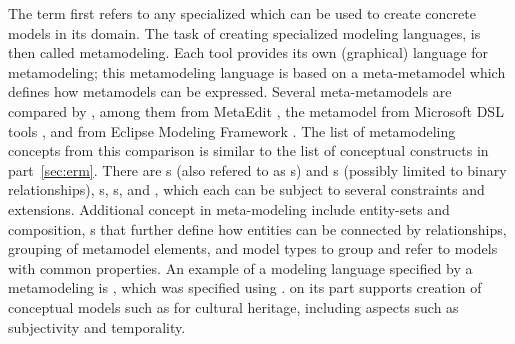 The term  first refers to any specialized  which can
be used to create concrete models in its domain. The task of creating
specialized modeling languages, is then called metamodeling. Each 
tool provides its own (graphical) language for metamodeling; this metamodeling
language is based on a meta-metamodel which defines how metamodels can be
expressed. Several meta-metamodels are compared by \textcite{Kern2011}, among
them  from MetaEdit \cite{Kelly2008}, the metamodel from Microsoft
DSL tools \cite{Cook2007}, and  from Eclipse Modeling Framework
\cite{Steinberg2009}. The list of metamodeling concepts from this comparison
is similar to the list of conceptual  constructs in
part~\ref{sec:erm}. There are s (also refered to as
s) and s (possibly limited to binary relationships), s,
s, and , which each can be subject to several
constraints and extensions. Additional concept in meta-modeling include
entity-sets and composition, s that further define how
entities can be connected by relationships, grouping of metamodel elements, and
model types to group and refer to models with common properties.  An example of
a modeling language specified by a metamodeling is 
\cite{GonzalezPerez2012c}, which was specified using . 
on its part supports creation of conceptual models such as  for
cultural heritage, including aspects such as subjectivity and temporality.

